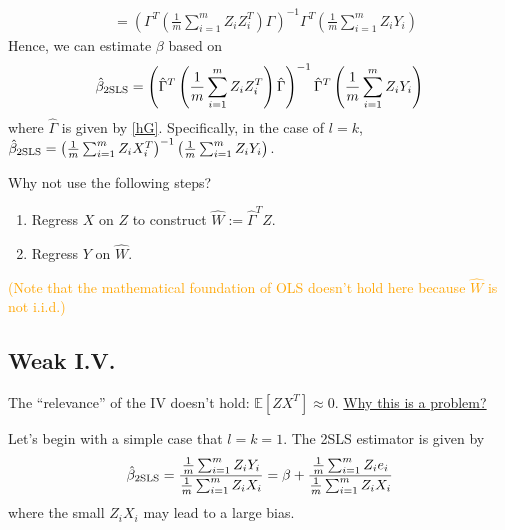 \documentclass[11pt]{elegantbook}
\begin{document}
\begin{enumerate}[(A).]
\begin{equation}
\begin{aligned}
            &=\left(\Gamma^T\left(\frac{1}{m}\sum_{i=1}^m Z_iZ_i^T\right)\Gamma\right)^{-1}\Gamma^T\left(\frac{1}{m}\sum_{i=1}^m Z_i Y_i\right)
        \end{aligned}
        \nonumber
    \end{equation}
    Hence, we can estimate $\beta$ based on
    \begin{equation}
        \begin{aligned}
            \hat{\beta}_\textnormal{2SLS}=\left(\hat{\Gamma}^T\left(\frac{1}{m}\sum_{i=1}^m Z_iZ_i^T\right)\hat{\Gamma}\right)^{-1}\hat{\Gamma}^T\left(\frac{1}{m}\sum_{i=1}^m Z_i Y_i\right)
        \end{aligned}
        \nonumber
    \end{equation}
    where $\hat{\Gamma}$ is given by \eqref{hG}. Specifically, in the case of $l=k$, $\hat{\beta}_\textnormal{2SLS}=\left(\frac{1}{m}\sum_{i=1}^m Z_iX_i^T\right)^{-1}\left(\frac{1}{m}\sum_{i=1}^m Z_i Y_i\right)$.
    \begin{remark}
        Why not use the following steps?
        \begin{enumerate}
            \item Regress $X$ on $Z$ to construct $\hat{W}:=\hat{\Gamma}^TZ$.
            \item Regress $Y$ on $\hat{W}$.
        \end{enumerate}
        \textcolor{orange}{(Note that the mathematical foundation of OLS doesn't hold here because $\hat{W}$ is not i.i.d.)}
    \end{remark}
\end{enumerate}

\subsection{Weak I.V.}
The ``relevance'' of the IV doesn't hold: $\mathbb{E}[ZX^T]\approx 0$. \underline{Why this is a problem?}

Let's begin with a simple case that $l=k=1$. The 2SLS estimator is given by
\begin{equation}
    \begin{aligned}
        \hat{\beta}_\textnormal{2SLS}=\frac{\frac{1}{m}\sum_{i=1}^mZ_iY_i}{\frac{1}{m}\sum_{i=1}^mZ_iX_i}=\beta+\frac{\frac{1}{m}\sum_{i=1}^mZ_ie_i}{\frac{1}{m}\sum_{i=1}^mZ_iX_i}
    \end{aligned}
    \nonumber
\end{equation}
where the small $Z_iX_i$ may lead to a large bias.
\end{document}
